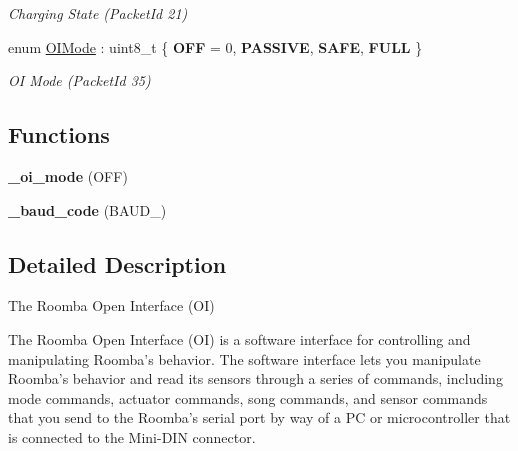 \begin{DoxyCompactItemize}
\begin{DoxyCompactList}\small\item\em Charging State (Packet\+Id 21) \end{DoxyCompactList}\item 
\hypertarget{namespaceroomba_1_1series500_1_1oi_a8dde6b4ac23e862ae50868c3963d7063}{enum \hyperlink{namespaceroomba_1_1series500_1_1oi_a8dde6b4ac23e862ae50868c3963d7063}{O\+I\+Mode} \+: uint8\+\_\+t \{ {\bfseries O\+F\+F} = 0, 
{\bfseries P\+A\+S\+S\+I\+V\+E}, 
{\bfseries S\+A\+F\+E}, 
{\bfseries F\+U\+L\+L}
 \}}\label{namespaceroomba_1_1series500_1_1oi_a8dde6b4ac23e862ae50868c3963d7063}

\begin{DoxyCompactList}\small\item\em O\+I Mode (Packet\+Id 35) \end{DoxyCompactList}\end{DoxyCompactItemize}
\subsection*{Functions}
\begin{DoxyCompactItemize}
\item 
\hypertarget{namespaceroomba_1_1series500_1_1oi_ae780d226077205cf8c321416c9a8471d}{{\bfseries \+\_\+oi\+\_\+mode} (O\+F\+F)}\label{namespaceroomba_1_1series500_1_1oi_ae780d226077205cf8c321416c9a8471d}

\item 
\hypertarget{namespaceroomba_1_1series500_1_1oi_afc1b9398d1221d6ab50da850412ce132}{{\bfseries \+\_\+baud\+\_\+code} (B\+A\+U\+D\+\_)}\label{namespaceroomba_1_1series500_1_1oi_afc1b9398d1221d6ab50da850412ce132}

\end{DoxyCompactItemize}


\subsection{Detailed Description}
The Roomba Open Interface (O\+I) 

The Roomba Open Interface (O\+I) is a software interface for controlling and manipulating Roomba’s behavior. The software interface lets you manipulate Roomba’s behavior and read its sensors through a series of commands, including mode commands, actuator commands, song commands, and sensor commands that you send to the Roomba’s serial port by way of a P\+C or microcontroller that is connected to the Mini-\/\+D\+I\+N connector. 